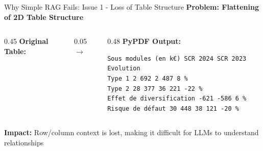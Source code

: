 \documentclass[11pt, aspectratio=169, xcolor=table]{beamer}
\begin{document}
\begin{frame}[fragile]{Why Simple RAG Fails: Issue 1 - Loss of Table Structure}
    \centering
    \textbf{\color{MainNavy}Problem: Flattening of 2D Table Structure}
    \vspace{0.3cm}
    
    \begin{columns}[c]
        \begin{column}{0.45\textwidth}
            \centering
            \small\textbf{Original Table:}
        \end{column}
        
        \begin{column}{0.05\textwidth}
            \centering $\rightarrow$
        \end{column}
        
        \begin{column}{0.48\textwidth}
            \small\textbf{PyPDF Output:}
            \begin{minipage}[t]{0.95\textwidth}
        \tiny
        \begin{verbatim}
Sous modules (en k€) SCR 2024 SCR 2023 Evolution 
Type 1 2 692 2 487 8 % 
Type 2 28 377 36 221 -22 % 
Effet de diversification -621 -586 6 % 
Risque de défaut 30 448 38 121 -20 %
        \end{verbatim}
    \end{minipage}
        \end{column}
    \end{columns}
    
    \vspace{0.3cm}
    \small\textbf{Impact:} Row/column context is lost, making it difficult for LLMs to understand relationships
\end{frame}
\end{document}
